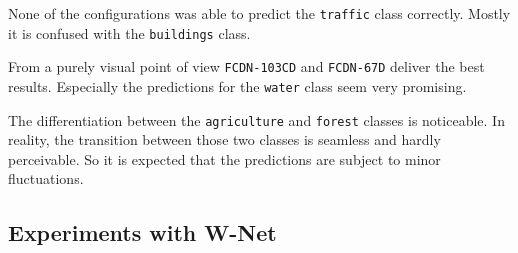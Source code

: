 None of the configurations was able to predict the \texttt{traffic} class correctly. Mostly it is confused with the \texttt{buildings} class.

From a purely visual point of view \texttt{FCDN-103CD} and \texttt{FCDN-67D} deliver the best results. Especially the predictions for the \texttt{water} class seem very promising.

The differentiation between the \texttt{agriculture} and \texttt{forest} classes is noticeable. In reality, the transition between those two classes is seamless and hardly perceivable. So it is expected that the predictions are subject to minor fluctuations.

\subsection{Experiments with W-Net}

